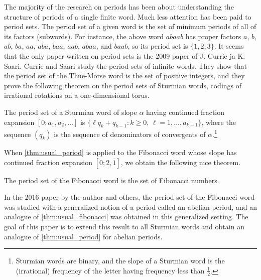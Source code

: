 \documentclass[a4paper,fleqn]{article}
\begin{document}
  The majority of the research on periods has been about understanding the structure of periods of a single finite
  word. Much less attention has been paid to period sets. The period set of a given word is the set of minimum periods
  of all of its factors (subwords). For instance, the above word $abaab$ has proper factors $a$, $b$, $ab$, $ba$, $aa$,
  $aba$, $baa$, $aab$, $abaa$, and $baab$, so its period set is $\{1, 2, 3\}$. It seems that the only paper written on
  period sets is the 2009 paper \cite{2009:least_periods_of_factors_of_infinite_words} of J. Currie ja K. Saari. Currie
  and Saari study the period sets of infinite words. They show that the period set of the Thue-Morse word
  \cite{1999:the_ubiquitous_prouhet-thue-morse_sequence} is the set of positive integers, and they prove the following
  theorem on the period sets of Sturmian words, codings of irrational rotations on a one-dimensional torus.

  \begin{theorem}\label{thm:usual_period}\cite[Cor.~3]{2009:least_periods_of_factors_of_infinite_words}
    The period set of a Sturmian word of slope $\alpha$ having continued fraction expansion $[0; a_1, a_2, \ldots]$ is
    $\{\ell q_k + q_{k-1} : \text{$k \geq 0$, $\ell = 1, \ldots, a_{k+1}$}\}$, where the sequence $(q_k)$ is the
    sequence of denominators of convergents of $\alpha$.\footnote{Sturmian words are binary, and the slope of a Sturmian word is the (irrational) frequency of the letter having frequency less than $\tfrac12$.}
  \end{theorem}

  When \autoref{thm:usual_period} is applied to the Fibonacci word whose slope has continued fraction expansion
  $[0; 2, \overline{1}]$, we obtain the following nice theorem.

  \begin{theorem}\label{thm:usual_fibonacci}\cite[Cor.~4]{2009:least_periods_of_factors_of_infinite_words}
    The period set of the Fibonacci word is the set of Fibonacci numbers.
  \end{theorem}

  In the 2016 paper \cite{2016:abelian_powers_and_repetitions_in_sturmian_words} by the author and others, the period
  set of the Fibonacci word was studied with a generalized notion of a period called an abelian period, and an analogue
  of \autoref{thm:usual_fibonacci} was obtained in this generalized setting. The goal of this paper is to extend this
  result to all Sturmian words and obtain an analogue of \autoref{thm:usual_period} for abelian periods.
\end{document}
